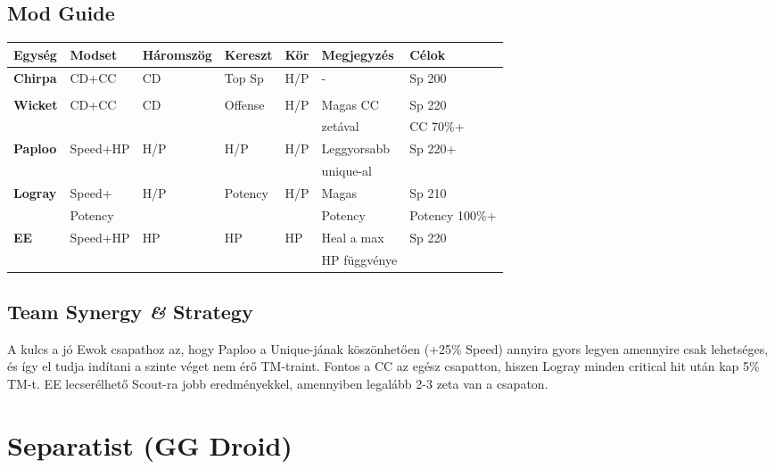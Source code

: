 \documentclass[11pt]{report}
\begin{document}
\section{Mod Guide}
\begin{center}
    \begin{tabular}{|l | l | l | l | l | l | l |}
        \hline
        Egység & Modset & Háromszög & Kereszt & Kör & Megjegyzés & Célok\\ \hline
        \textbf{Chirpa} & CD+CC & CD & Top Sp & H/P & - & Sp 200\\
        &  &  &  &  &  & \\ \hline
        \textbf{Wicket} & CD+CC & CD & Offense & H/P & Magas CC & Sp 220\\
        &  &  &  &  & zetával & CC 70\%+\\ \hline
        \textbf{Paploo} & Speed+HP & H/P & H/P & H/P & Leggyorsabb & Sp 220+\\
        &  &  &  &  & unique-al & \\ \hline
        \textbf{Logray} & Speed+ & H/P & Potency & H/P & Magas & Sp 210\\
        & Potency &  &  &  & Potency & Potency 100\%+\\ \hline
        \textbf{EE} & Speed+HP & HP & HP & HP & Heal a max & Sp 220\\
        &  &  &  &  & HP függvénye & \\ \hline
    \end{tabular}
\end{center}
\section{Team Synergy \textit{\&} Strategy}
A kulcs a jó Ewok csapathoz az, hogy Paploo a Unique-jának köszönhetően (+25\% Speed) annyira gyors legyen amennyire csak lehetséges, és így el tudja indítani a szinte véget nem érő TM-traint. Fontos a CC az egész csapatton, hiszen Logray minden critical hit után kap 5\% TM-t. EE lecserélhető Scout-ra jobb eredményekkel, amennyiben legalább 2-3 zeta van a csapaton.

\chapter{Separatist (GG Droid)}
\end{document}

